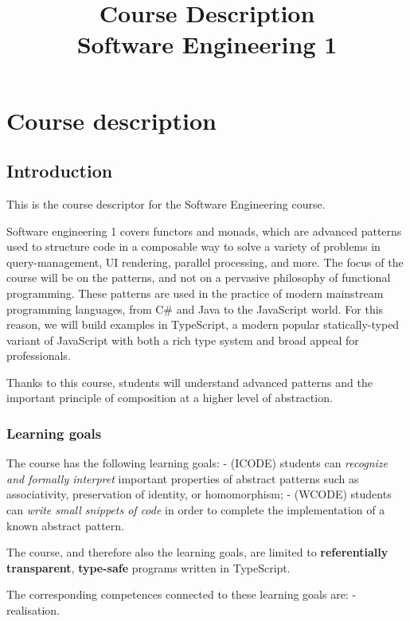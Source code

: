 \documentclass{article}
\title{Course Description\\ Software Engineering 1}
\date { }
\begin{document}
    
    
    \maketitle
    
\section { Course description }

    \subsection{Introduction}\label{introduction}

This is the course descriptor for the Software Engineering course.

Software engineering 1 covers functors and monads, which are advanced
patterns used to structure code in a composable way to solve a variety
of problems in query-management, UI rendering, parallel processing, and
more. The focus of the course will be on the patterns, and not on a
pervasive philosophy of functional programming. These patterns are used
in the practice of modern mainstream programming languages, from C\# and
Java to the JavaScript world. For this reason, we will build examples in
TypeScript, a modern popular statically-typed variant of JavaScript with
both a rich type system and broad appeal for professionals.

Thanks to this course, students will understand advanced patterns and
the important principle of composition at a higher level of abstraction.

    \subsubsection{Learning goals}\label{learning-goals}

The course has the following learning goals: - (ICODE) students can
\emph{recognize and formally interpret} important properties of abstract
patterns such as associativity, preservation of identity, or
homomorphism; - (WCODE) students can \emph{write small snippets of code}
in order to complete the implementation of a known abstract pattern.

The course, and therefore also the learning goals, are limited to
\textbf{referentially transparent}, \textbf{type-safe} programs written
in TypeScript.

The corresponding competences connected to these learning goals are: -
realisation.
\end{document}
